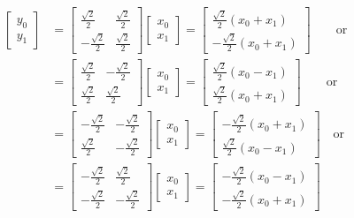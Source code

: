 \documentclass{article}
\begin{document}
\begin{align*}
    \begin{bmatrix}
        y_0 \\
        y_1 
    \end{bmatrix}
    &= 
    \begin{bmatrix}
        \frac{\sqrt{2}}{2} & \frac{\sqrt{2}}{2} \\
        -\frac{\sqrt{2}}{2} & \frac{\sqrt{2}}{2}
    \end{bmatrix}
    \begin{bmatrix}
        x_0 \\
        x_1
    \end{bmatrix} 
    = \begin{bmatrix}
        \frac{\sqrt{2}}{2} (x_0 + x_1) \\
        -\frac{\sqrt{2}}{2} (x_0 + x_1)
    \end{bmatrix}
    \qquad \text{or} \qquad \\
    &= 
    \begin{bmatrix}
        \frac{\sqrt{2}}{2} & -\frac{\sqrt{2}}{2} \\
        \frac{\sqrt{2}}{2} & \frac{\sqrt{2}}{2}
    \end{bmatrix}
    \begin{bmatrix}
        x_0 \\
        x_1
    \end{bmatrix} 
    = \begin{bmatrix}
        \frac{\sqrt{2}}{2} (x_0 - x_1) \\
        \frac{\sqrt{2}}{2} (x_0 + x_1)
    \end{bmatrix} \qquad \text{or} \qquad \\
    &= 
    \begin{bmatrix}
        -\frac{\sqrt{2}}{2} & -\frac{\sqrt{2}}{2} \\
        \frac{\sqrt{2}}{2} & -\frac{\sqrt{2}}{2}
    \end{bmatrix}
    \begin{bmatrix}
        x_0 \\
        x_1
    \end{bmatrix} 
    = \begin{bmatrix}
        -\frac{\sqrt{2}}{2} (x_0 + x_1) \\
        \frac{\sqrt{2}}{2} (x_0 - x_1)
    \end{bmatrix} \quad \text{or} \quad \\
    &= 
    \begin{bmatrix}
        -\frac{\sqrt{2}}{2} & \frac{\sqrt{2}}{2} \\
        -\frac{\sqrt{2}}{2} & -\frac{\sqrt{2}}{2}
    \end{bmatrix}
    \begin{bmatrix}
        x_0 \\
        x_1
    \end{bmatrix}
    = \begin{bmatrix}
        -\frac{\sqrt{2}}{2} (x_0 - x_1) \\
        -\frac{\sqrt{2}}{2} (x_0 + x_1)
    \end{bmatrix}
\end{align*}
\end{document}
